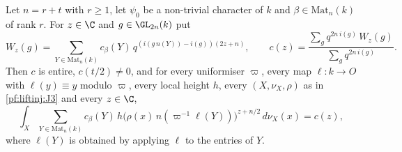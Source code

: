 \begin{lemma}\label{pf:liftinj:jploc}
Let $n=r+t$ with $r\ge1$, let $\psi_0$ be a non-trivial character of $k$ and $\beta\in\mathrm{Mat}_n(k)$ of rank $r$. For $z\in\C$ and
$g\in\GL_{2n}(k)$ put
\begin{equation}\label{eq:pf:liftinj:cz}
W_z(g)=\sum_{Y\in\mathrm{Mat}_n(k)}c_\beta(Y)\,q^{(i(g\,n(Y))-i(g))(2z+n)},\qquad
c(z)=\frac{\sum_{g}q^{2n\,i(g)}\,W_z(g)}{\sum_{g}q^{2n\,i(g)}} .
\end{equation}
Then $c$ is entire, $c(t/2)\ne0$, and for every uniformiser $\varpi$, every map $\ell:k\to O$ with $\ell(y)\equiv y$ modulo $\varpi$, every
local height $h$, every $(X,\nu_X,\rho)$ as in \ref{pf:liftinj:J3} and every $z\in\C$,
\begin{equation}\label{eq:pf:liftinj:jploc}
\int_X\sum_{Y\in\mathrm{Mat}_n(k)}c_\beta(Y)\,h\bigl(\rho(x)\,n(\varpi^{-1}\ell(Y))\bigr)^{z+n/2}\,d\nu_X(x)=c(z),
\end{equation}
where $\ell(Y)$ is obtained by applying $\ell$ to the entries of $Y$.
\end{lemma}

